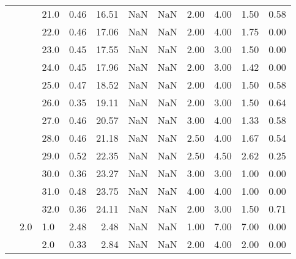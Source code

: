 \begin{tabular}{lllrrrrrrrr}
       &     & 21.0 &      0.46 &      16.51 &               NaN &                NaN & 2.00 &   4.00 &             1.50 &                         0.58 \\
       &     & 22.0 &      0.46 &      17.06 &               NaN &                NaN & 2.00 &   4.00 &             1.75 &                         0.00 \\
       &     & 23.0 &      0.45 &      17.55 &               NaN &                NaN & 2.00 &   3.00 &             1.50 &                         0.00 \\
       &     & 24.0 &      0.45 &      17.96 &               NaN &                NaN & 2.00 &   3.00 &             1.42 &                         0.00 \\
       &     & 25.0 &      0.47 &      18.52 &               NaN &                NaN & 2.00 &   4.00 &             1.50 &                         0.58 \\
       &     & 26.0 &      0.35 &      19.11 &               NaN &                NaN & 2.00 &   3.00 &             1.50 &                         0.64 \\
       &     & 27.0 &      0.46 &      20.57 &               NaN &                NaN & 3.00 &   4.00 &             1.33 &                         0.58 \\
       &     & 28.0 &      0.46 &      21.18 &               NaN &                NaN & 2.50 &   4.00 &             1.67 &                         0.54 \\
       &     & 29.0 &      0.52 &      22.35 &               NaN &                NaN & 2.50 &   4.50 &             2.62 &                         0.25 \\
       &     & 30.0 &      0.36 &      23.27 &               NaN &                NaN & 3.00 &   3.00 &             1.00 &                         0.00 \\
       &     & 31.0 &      0.48 &      23.75 &               NaN &                NaN & 4.00 &   4.00 &             1.00 &                         0.00 \\
       &     & 32.0 &      0.36 &      24.11 &               NaN &                NaN & 2.00 &   3.00 &             1.50 &                         0.71 \\
       & 2.0 & 1.0  &      2.48 &       2.48 &               NaN &                NaN & 1.00 &   7.00 &             7.00 &                         0.00 \\
       &     & 2.0  &      0.33 &       2.84 &               NaN &                NaN & 2.00 &   4.00 &             2.00 &                         0.00 \\

\end{tabular}
